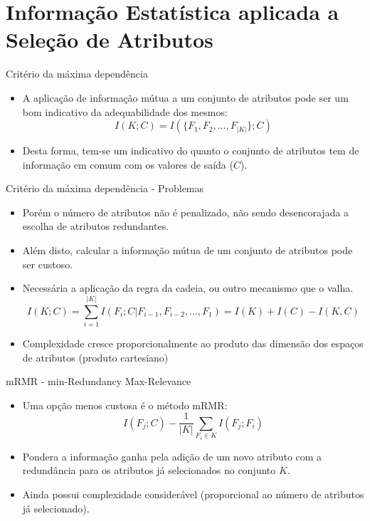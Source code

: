 \documentclass{beamer}
\begin{document}
\section{Informação Estatística aplicada a Seleção de Atributos}


\begin{frame}{Critério da máxima dependência}
	\begin{itemize}
		\item A aplicação de informação mútua a um conjunto de atributos pode ser um bom indicativo da adequabilidade dos mesmos:
		$$I(K;C)=I(\{F_1,F_2,\dots,F_{|K|}\};C)$$
		\item Desta forma, tem-se um indicativo do quanto o conjunto de atributos tem de informação em comum com os valores de saída ($C$).
	\end{itemize}
\end{frame}

\begin{frame}{Critério da máxima dependência - Problemas}
	\begin{itemize}
		\item Porém o número de atributos não é penalizado, não sendo desencorajada a escolha de atributos redundantes.	
		\item Além disto, calcular a informação mútua de um conjunto de atributos pode ser custoso.
		\item Necessária a aplicação da regra da cadeia, ou outro mecanismo que o valha.
		$$I(K;C)=\sum_{i=1}^{|K|} I(F_i; C| F_{i-1}, F_{i-2}, \dots, F_{1})=I(K)+I(C)-I(K,C)$$
		\item Complexidade cresce proporcionalmente ao produto das dimensão dos espaços de atributos (produto cartesiano)
	\end{itemize}
\end{frame}


\begin{frame}{mRMR - min-Redundancy Max-Relevance}
	\begin{itemize}
		\item Uma opção menos custosa é o método mRMR:
		$$I(F_j;C)- \frac{1}{|K|} \sum_{F_i \in K} I(F_j;F_i)$$
		\item Pondera a informação ganha pela adição de um novo atributo com a redundância para os atributos já selecionados no conjunto $K$.
		\item Ainda possui complexidade considerável (proporcional ao número de atributos já selecionado).
	\end{itemize}
\end{frame}
\end{document}

